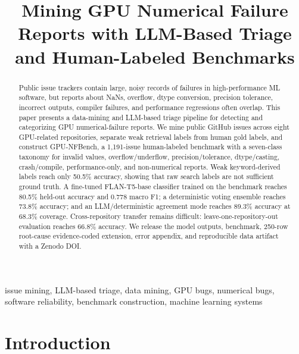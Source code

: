 \documentclass[conference]{IEEEtran}
\newcommand{\bench}{GPU-NFBench}
\begin{document}
\title{Mining GPU Numerical Failure Reports with LLM-Based Triage and Human-Labeled Benchmarks}

\author{
}

\maketitle

\begin{abstract}
Public issue trackers contain large, noisy records of failures in
high-performance ML software, but reports about NaNs, overflow, dtype
conversion, precision tolerance, incorrect outputs, compiler failures, and
performance regressions often overlap. This paper presents a data-mining and
LLM-based triage pipeline for detecting and categorizing GPU numerical-failure
reports. We mine public GitHub issues across eight GPU-related repositories,
separate weak retrieval labels from human gold labels, and construct
\bench{}, a 1,191-issue human-labeled benchmark with a seven-class taxonomy
for invalid values, overflow/underflow, precision/tolerance, dtype/casting,
crash/compile, performance-only, and non-numerical reports. Weak
keyword-derived labels reach only 50.5\% accuracy, showing that raw search
labels are not sufficient ground truth. A fine-tuned FLAN-T5-base classifier
trained on the benchmark reaches 80.5\% held-out accuracy and 0.778 macro F1;
a deterministic voting ensemble reaches 73.8\% accuracy; and an
LLM/deterministic agreement mode reaches 89.3\% accuracy at 68.3\% coverage.
Cross-repository transfer remains difficult: leave-one-repository-out
evaluation reaches 66.8\% accuracy. We release the model outputs, benchmark,
250-row root-cause evidence-coded extension, error appendix, and reproducible
data artifact with a Zenodo DOI.
\end{abstract}

\begin{IEEEkeywords}
issue mining, LLM-based triage, data mining, GPU bugs, numerical bugs,
software reliability, benchmark construction, machine learning systems
\end{IEEEkeywords}

\section{Introduction}
\end{document}
